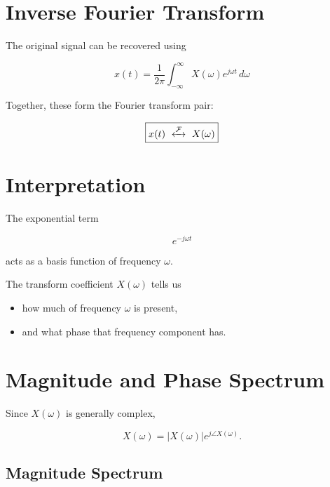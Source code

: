 
\section{Inverse Fourier Transform}

The original signal can be recovered using

\[
\boxed{
x(t)=
\frac{1}{2\pi}
\int_{-\infty}^{\infty}
X(\omega)e^{j\omega t}\,d\omega
}
\]

Together, these form the Fourier transform pair:

\[
\boxed
{
x(t)\ \xleftrightarrow{\mathcal{F}}\ X(\omega)
}
\]


\section{Interpretation}

The exponential term

\[
e^{-j\omega t}
\]

acts as a basis function of frequency \(\omega\).

The transform coefficient \(X(\omega)\) tells us

\begin{itemize}
\item how much of frequency \(\omega\) is present,
\item and what phase that frequency component has.
\end{itemize}


\section{Magnitude and Phase Spectrum}

Since \(X(\omega)\) is generally complex,

\[
X(\omega)=|X(\omega)|e^{j\angle X(\omega)}.
\]


\subsection{Magnitude Spectrum}

